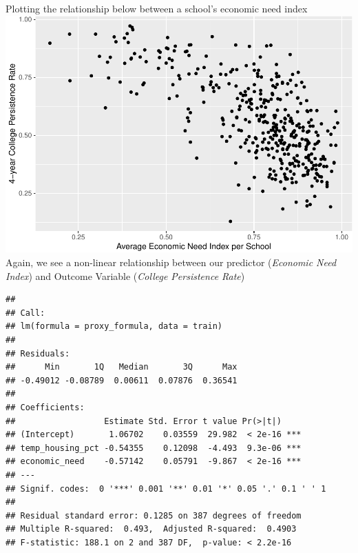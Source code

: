 \documentclass[
  man]{apa6}
\begin{document}
Plotting the relationship below between a school's economic need index
\includegraphics{final-project_files/figure-latex/unnamed-chunk-5-1.pdf}
Again, we see a non-linear relationship between our predictor (\emph{Economic Need Index}) and Outcome Variable (\emph{College Persistence Rate})

\begin{verbatim}
## 
## Call:
## lm(formula = proxy_formula, data = train)
## 
## Residuals:
##      Min       1Q   Median       3Q      Max 
## -0.49012 -0.08789  0.00611  0.07876  0.36541 
## 
## Coefficients:
##                  Estimate Std. Error t value Pr(>|t|)    
## (Intercept)       1.06702    0.03559  29.982  < 2e-16 ***
## temp_housing_pct -0.54355    0.12098  -4.493  9.3e-06 ***
## economic_need    -0.57142    0.05791  -9.867  < 2e-16 ***
## ---
## Signif. codes:  0 '***' 0.001 '**' 0.01 '*' 0.05 '.' 0.1 ' ' 1
## 
## Residual standard error: 0.1285 on 387 degrees of freedom
## Multiple R-squared:  0.493,  Adjusted R-squared:  0.4903 
## F-statistic: 188.1 on 2 and 387 DF,  p-value: < 2.2e-16
\end{verbatim}
\end{document}

